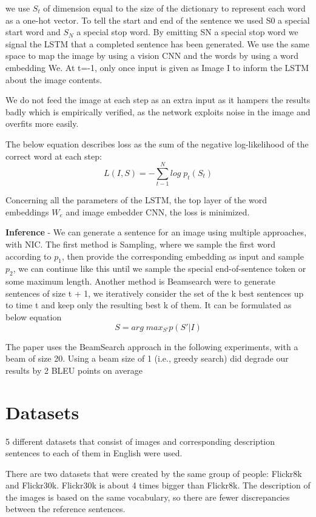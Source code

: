 \documentclass[a4paper,UKenglish,cleveref, autoref, thm-restate]{lipics-v2021}
\begin{document}
we use $S_{t}$ of dimension equal to the size of the dictionary to represent each word as a one-hot vector.
To tell the start and end of the sentence we used S0 a special start word and $S_{N}$ a special stop word. By emitting SN a special stop word we signal the LSTM that a completed sentence has been generated.
We use the same space to map the image by using a vision CNN and the words by using a word embedding We.
At t=-1, only once input is given as Image I to inform the LSTM about the image contents.

We do not feed the image at each step as an extra input as it hampers the results badly which is empirically verified, as the network exploits noise in the image and overfits more easily.

The below equation describes loss as the sum of the negative log-likelihood of the correct word at each step:
\[ L(I,S) = -\sum_{t-1}^{N} log\; p_{t}(S_{t})
\label{eq:equation13} \tag{13} \]

Concerning all the parameters of the LSTM, the top layer of the word embeddings $W_{e}$ and image embedder CNN, the loss is minimized.

\textbf{Inference} -
We can generate a sentence for an image using multiple approaches, with NIC.  The first method is Sampling, where we sample the first word according to $p_{1}$, then provide the corresponding embedding as input and sample $p_{2}$, we can continue like this until we sample the special end-of-sentence token or some maximum length.
Another method is Beamsearch were to generate sentences of size t + 1, we iteratively consider the set of the k best sentences up to time t and keep only the resulting best k of them.
It can be formulated as below equation
\[
S = arg\; max_{S'} p(S' |I)
\]

The paper uses the BeamSearch approach in the following experiments, with a beam of size 20. Using a beam size of 1 (i.e., greedy search) did degrade our results by 2 BLEU points on average

\section{Datasets}
\label{Datasets}
5 different datasets that consist of images and corresponding description sentences to each of them  in English were used.

There are two datasets that were created by the same group of people: Flickr8k and Flickr30k. Flickr30k is about 4 times bigger than Flickr8k. The description of the images is based on the same vocabulary, so there are fewer discrepancies between the reference sentences.
\end{document}
